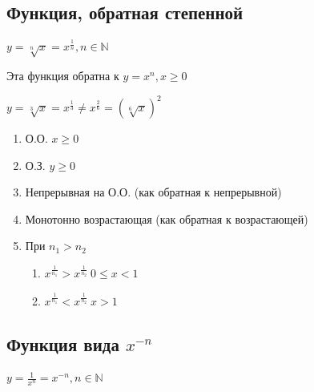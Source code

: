 \documentclass{article}
\begin{document}
    \subsection{Функция, обратная степенной}

    \(y = \sqrt[n]{x} = x^{\frac{1}{n}}, n \in \mathbb{N} \)

    Эта функция обратна к \( y = x^n, x \geq 0 \)

    \( y = \sqrt[3]{x} = x^{\frac{1}{3}} \neq x^{\frac{2}{6}} = (\sqrt[6]{x})^2 \)

    \begin{enumerate}
        \item О.О. \( x \geq 0 \)
        \item О.З. \( y \geq 0 \)
        \item Непрерывная на О.О. (как обратная к непрерывной)
        \item Монотонно возрастающая (как обратная к возрастающей)
        \item При \(n_1 > n_2\)
        \begin{enumerate}
            \item \(x^{\frac{1}{n_1}} > x^{\frac{1}{n_2}}\ 0 \leq x < 1\)
            \item \( x^{\frac{1}{n_1}} < x^{\frac{1}{n_2}}\ x > 1 \)
        \end{enumerate}
    \end{enumerate}

   \subsection{Функция вида \(x^{-n}\)}

    \( y = \frac{1}{x^n} = x^{-n}, n \in \mathbb{N}\)
\end{document}
